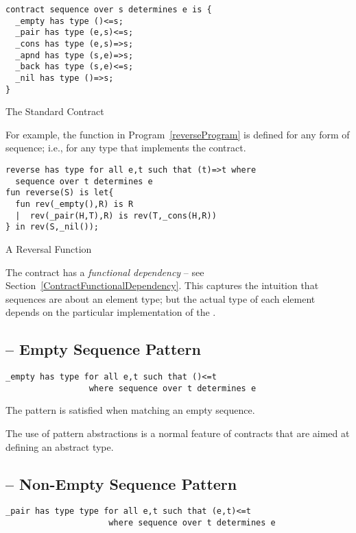 \begin{program}[hbtp]
\begin{lstlisting}
contract sequence over s determines e is {
  _empty has type ()<=s;
  _pair has type (e,s)<=s;
  _cons has type (e,s)=>s;
  _apnd has type (s,e)=>s;
  _back has type (s,e)<=s;
  _nil has type ()=>s;
}
\end{lstlisting}
\caption{The Standard  Contract}\label{sequenceContractDef}
\end{program}
\noindent
For example, the  function in Program~\vref{reverseProgram} is defined for any form of sequence; i.e., for any type that implements the  contract.
\begin{program}[hbtp]
\begin{lstlisting}
reverse has type for all e,t such that (t)=>t where
  sequence over t determines e
fun reverse(S) is let{
  fun rev(_empty(),R) is R
  |  rev(_pair(H,T),R) is rev(T,_cons(H,R))
} in rev(S,_nil());
\end{lstlisting}
\caption{A  Reversal Function}\label{reverseProgram}
\end{program}
\begin{aside}
The  contract has a \emph{functional dependency} -- see Section~\vref{ContractFunctionalDependency}. This captures the intuition that sequences are about an element type; but the actual type of each element depends on the particular implementation of the .
\end{aside}

\subsection{ -- Empty Sequence Pattern}
\label{emptyPattern}
\begin{lstlisting}
_empty has type for all e,t such that ()<=t 
                 where sequence over t determines e
\end{lstlisting}

The  pattern is satisfied when matching an empty sequence.

\begin{aside}
The use of pattern abstractions is a normal feature of contracts that are aimed at defining an abstract type. 
\end{aside}

\subsection{ -- Non-Empty Sequence Pattern}
\label{nonEmptyPattern}
\begin{lstlisting}
_pair has type type for all e,t such that (e,t)<=t
                     where sequence over t determines e
\end{lstlisting}

